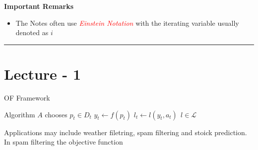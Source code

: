 
\textbf{Important Remarks}

\begin{itemize}
    \item The Notes often use \textcolor{red}{\textit{Einstein Notation}}
    with the iterating variable usually denoted as $i$
\end{itemize}


\vspace*{10pt}
\hrule
\vspace{10pt}

\section{Lecture - 1}





\begin{algorithm}
    \caption{OF Framework}
    \begin{algorithmic}[1]
            \State Algorithm $A$ chooses $p_t \in D_t$
            \State $y_t \gets f(p_t)$
            \State $l_t \gets l(y_t, a_t) \ \ l \in \mathcal{L}$ 
        \EndFor
    \end{algorithmic}
\end{algorithm}



Applications may include weather filetring, spam filtering and stoick prediction.
In spam filtering the objective function

